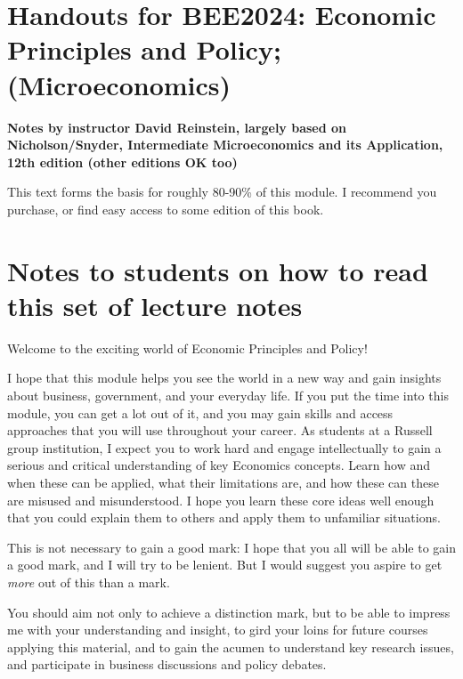 \documentclass[]{article}
\title{}
\author{}
\date{}
\begin{document}
{
\setcounter{tocdepth}{2}
\tableofcontents
}
\hypertarget{handouts-for-bee2024-economic-principles-and-policy-microeconomics}{%
\section{Handouts for BEE2024: Economic Principles and Policy; (Microeconomics)}\label{handouts-for-bee2024-economic-principles-and-policy-microeconomics}}

\textbf{Notes by instructor David Reinstein, largely based on Nicholson/Snyder, Intermediate Microeconomics and its Application, 12th edition (other editions OK too)}

This text forms the basis for roughly 80-90\% of this module. I recommend you purchase, or find easy access to some edition of this book.

\hypertarget{notes-to-students-on-how-to-read-this-set-of-lecture-notes}{%
\section{Notes to students on how to read this set of lecture notes}\label{notes-to-students-on-how-to-read-this-set-of-lecture-notes}}

Welcome to the exciting world of Economic Principles and Policy!

I hope that this module helps you see the world in a new way and gain insights about business, government, and your everyday life. If you put the time into this module, you can get a lot out of it, and you may gain skills and access approaches that you will use throughout your career. As students at a Russell group institution, I expect you to work hard and engage intellectually to gain a serious and critical understanding of key Economics concepts. Learn how and when these can be applied, what their limitations are, and how these can these are misused and misunderstood. I hope you learn these core ideas well enough that you could explain them to others and apply them to unfamiliar situations.

This is not necessary to gain a good mark: I hope that you all will be able to gain a good mark, and I will try to be lenient. But I would suggest you aspire to get \emph{more} out of this than a mark.

You should aim not only to achieve a distinction mark, but to be able to impress me with your understanding and insight, to gird your loins for future courses applying this material, and to gain the acumen to understand key research issues, and participate in business discussions and policy debates.
\end{document}
